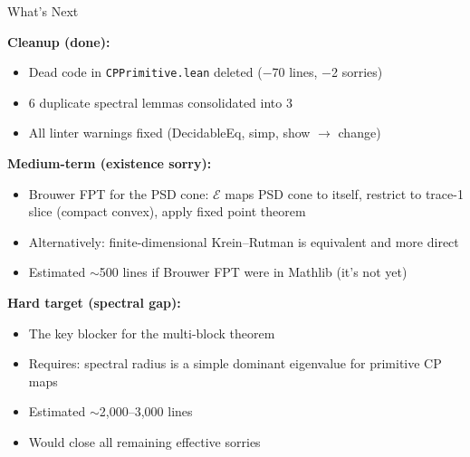\documentclass[aspectratio=169,10pt]{beamer}
\begin{document}
\begin{frame}{What's Next}
    \vspace{-0.3em}

    \textbf{Cleanup (done):}
    \begin{itemize}\itemsep0.1em\small
        \item[\textcolor{leangreen}{\checkmark}] Dead code in \texttt{CPPrimitive.lean} deleted ($-$70 lines, $-$2 sorries)
        \item[\textcolor{leangreen}{\checkmark}] 6 duplicate spectral lemmas consolidated into 3
        \item[\textcolor{leangreen}{\checkmark}] All linter warnings fixed (DecidableEq, simp, show $\to$ change)
    \end{itemize}

    \vspace{0.3em}
    \textbf{Medium-term (existence sorry):}
    \begin{itemize}\itemsep0.1em\small
        \item Brouwer FPT for the PSD cone: $\mathcal{E}$ maps PSD cone to itself,
            restrict to trace-1 slice (compact convex), apply fixed point theorem
        \item Alternatively: finite-dimensional Krein--Rutman is equivalent and more direct
        \item Estimated $\sim$500 lines if Brouwer FPT were in Mathlib (it's not yet)
    \end{itemize}

    \vspace{0.3em}
    \textbf{Hard target (spectral gap):}
    \begin{itemize}\itemsep0.1em\small
        \item The key blocker for the multi-block theorem
        \item Requires: spectral radius is a simple dominant eigenvalue for primitive CP maps
        \item Estimated $\sim$2{,}000--3{,}000 lines
        \item Would close all remaining effective sorries
    \end{itemize}
\end{frame}
\end{document}

